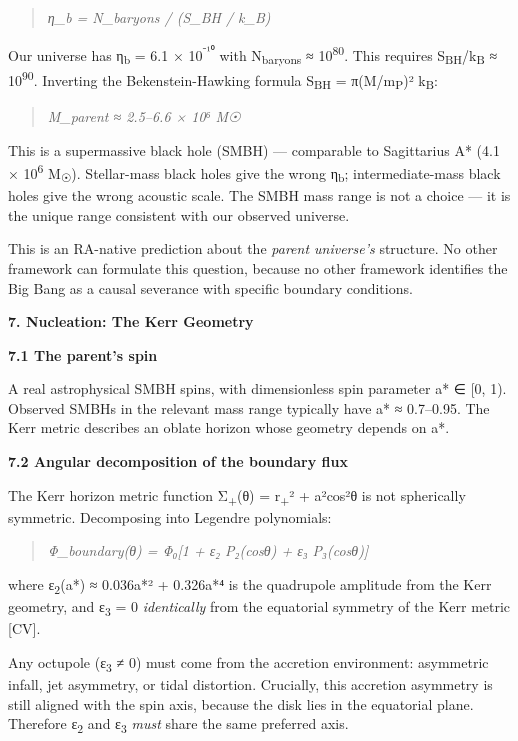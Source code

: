 \documentclass[12pt,a4paper]{article}
\begin{document}
\begin{quote}
\emph{η\_b = N\_baryons / (S\_BH / k\_B)}
\end{quote}

Our universe has η\textsubscript{b} = 6.1 × 10\textsuperscript{⁻¹⁰} with
N\textsubscript{baryons} ≈ 10\textsuperscript{80}. This requires
S\textsubscript{BH}/k\textsubscript{B} ≈ 10\textsuperscript{90}.
Inverting the Bekenstein-Hawking formula S\textsubscript{BH} =
π(M/m\textsubscript{P})² k\textsubscript{B}:

\begin{quote}
\emph{M\_parent ≈ 2.5--6.6 × 10⁶ M☉}
\end{quote}

This is a supermassive black hole (SMBH) --- comparable to Sagittarius
A* (4.1 × 10\textsuperscript{6} M\textsubscript{☉}). Stellar-mass black
holes give the wrong η\textsubscript{b}; intermediate-mass black holes
give the wrong acoustic scale. The SMBH mass range is not a choice ---
it is the unique range consistent with our observed universe.

This is an RA-native prediction about the \emph{parent universe's}
structure. No other framework can formulate this question, because no
other framework identifies the Big Bang as a causal severance with
specific boundary conditions.

\textbf{7. Nucleation: The Kerr Geometry}

\textbf{7.1 The parent's spin}

A real astrophysical SMBH spins, with dimensionless spin parameter a* ∈
{[}0, 1). Observed SMBHs in the relevant mass range typically have a* ≈
0.7--0.95. The Kerr metric describes an oblate horizon whose geometry
depends on a*.

\textbf{7.2 Angular decomposition of the boundary flux}

The Kerr horizon metric function Σ\textsubscript{+}(θ) =
r\textsubscript{+}² + a²cos²θ is not spherically symmetric. Decomposing
into Legendre polynomials:

\begin{quote}
\emph{Φ\_boundary(θ) = Φ₀{[}1 + ε₂ P₂(cosθ) + ε₃ P₃(cosθ){]}}
\end{quote}

where ε\textsubscript{2}(a*) ≈ 0.036a*² + 0.326a*⁴ is the quadrupole
amplitude from the Kerr geometry, and ε\textsubscript{3} = 0
\emph{identically} from the equatorial symmetry of the Kerr metric
{[}CV{]}.

Any octupole (ε\textsubscript{3} ≠ 0) must come from the accretion
environment: asymmetric infall, jet asymmetry, or tidal distortion.
Crucially, this accretion asymmetry is still aligned with the spin axis,
because the disk lies in the equatorial plane. Therefore
ε\textsubscript{2} and ε\textsubscript{3} \emph{must} share the same
preferred axis.
\end{document}

